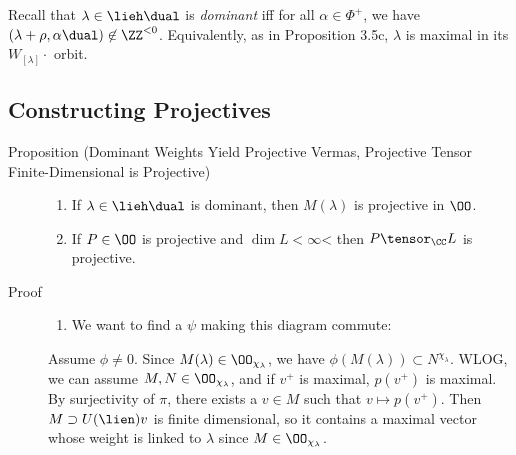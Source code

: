 Recall that \(\lambda \in \lieh\dual\) is \emph{dominant} iff for all
\(\alpha \in \Phi^+\), we have
\((\lambda + \rho, \alpha\dual) \not\in\ZZ^{<0}\). Equivalently, as in
Proposition 3.5c, \(\lambda\) is maximal in its \(W_{[\lambda]}\cdot\)
orbit.

\hypertarget{constructing-projectives}{%
\subsection{Constructing Projectives}\label{constructing-projectives}}

\begin{description}
\item[Proposition (Dominant Weights Yield Projective Vermas, Projective
Tensor Finite-Dimensional is Projective)]
\begin{enumerate}
\def\labelenumi{\alph{enumi}.}
\item
  If \(\lambda \in \lieh\dual\) is dominant, then \(M(\lambda)\) is
  projective in \(\OO\).
\item
  If \(P\in \OO\) is projective and \(\dim L < \infty\)\textless{} then
  \(P \tensor_\CC L\) is projective.
\end{enumerate}
\item[Proof]
\begin{enumerate}
\def\labelenumi{\alph{enumi}.}
\tightlist
\item
  We want to find a \(\psi\) making this diagram commute:

  \begin{center}
    \end{center}
\end{enumerate}

Assume \(\phi \neq 0\). Since \(M(\lambda) \in \OO_{\chi_\lambda}\), we
have \(\phi(M(\lambda)) \subset N^{\chi_\lambda}\). WLOG, we can assume
\(M, N \in \OO_{\chi_\lambda}\), and if \(v^+\) is maximal, \(p(v^+)\)
is maximal. By surjectivity of \(\pi\), there exists a \(v\in M\) such
that \(v \mapsto p(v^+)\). Then \(M \supset U(\lien) v\) is finite
dimensional, so it contains a maximal vector whose weight is linked to
\(\lambda\) since \(M\in \OO_{\chi_\lambda}\).


\end{description}
